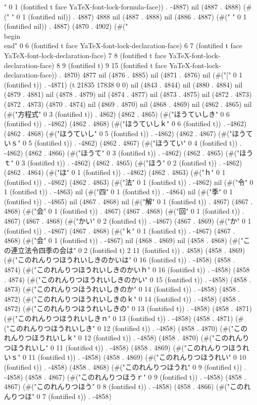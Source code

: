 " 0 1 (fontified t face YaTeX-font-lock-formula-face)) . -4887) nil (4887 . 4888) (#(" " 0 1 (fontified nil)) . 4887) 4888 nil (4887 . 4888) nil (4886 . 4887) (#(" " 0 1 (fontified nil)) . 4887) (4870 . 4902) (#("\\begin{}
\\end{}" 0 6 (fontified t face YaTeX-font-lock-declaration-face) 6 7 (fontified t face YaTeX-font-lock-declaration-face) 7 8 (fontified t face YaTeX-font-lock-declaration-face) 8 9 (fontified t) 9 15 (fontified t face YaTeX-font-lock-declaration-face)) . 4870) 4877 nil (4876 . 4885) nil (4871 . 4876) nil (#("[" 0 1 (fontified t)) . -4871) (t 21835 17838 0 0) nil (4843 . 4844) nil (4880 . 4884) nil (4879 . 4881) nil (4878 . 4879) nil (4874 . 4877) nil (4873 . 4875) nil (4872 . 4873) (4872 . 4873) (4870 . 4874) nil (4869 . 4870) nil (4868 . 4869) nil (4862 . 4865) nil (#("方程式" 0 3 (fontified t)) . 4862) (4862 . 4865) (#("ほうていしき" 0 6 (fontified t)) . -4862) (4862 . 4868) (#("ほうていしｋ" 0 6 (fontified t)) . -4862) (4862 . 4868) (#("ほうていし" 0 5 (fontified t)) . -4862) (4862 . 4867) (#("ほうていｓ" 0 5 (fontified t)) . -4862) (4862 . 4867) (#("ほうてい" 0 4 (fontified t)) . -4862) (4862 . 4866) (#("ほうて" 0 3 (fontified t)) . -4862) (4862 . 4865) (#("ほうｔ" 0 3 (fontified t)) . -4862) (4862 . 4865) (#("ほう" 0 2 (fontified t)) . -4862) (4862 . 4864) (#("ほ" 0 1 (fontified t)) . -4862) (4862 . 4863) (#("ｈ" 0 1 (fontified t)) . -4862) (4862 . 4863) (#("法" 0 1 (fontified t)) . -4862) nil (#("令" 0 1 (fontified t)) . -4863) nil (#("四" 0 1 (fontified t)) . -4864) nil (#("季" 0 1 (fontified t)) . -4865) nil (4867 . 4868) nil (#("解" 0 1 (fontified t)) . 4867) (4867 . 4868) (#("会" 0 1 (fontified t)) . 4867) (4867 . 4868) (#("回" 0 1 (fontified t)) . 4867) (4867 . 4868) (#("かい" 0 2 (fontified t)) . -4867) (4867 . 4869) (#("か" 0 1 (fontified t)) . -4867) (4867 . 4868) (#("ｋ" 0 1 (fontified t)) . -4867) (4867 . 4868) (#("会" 0 1 (fontified t)) . -4867) nil (4868 . 4869) nil (4858 . 4868) (#("この連立法令四季の会は" 0 2 (fontified t) 2 11 (fontified t)) . 4858) (4858 . 4869) (#("このれんりつほうれいしきのかいは" 0 16 (fontified t)) . -4858) (4858 . 4874) (#("このれんりつほうれいしきのかいｈ" 0 16 (fontified t)) . -4858) (4858 . 4874) (#("このれんりつほうれいしきのかい" 0 15 (fontified t)) . -4858) (4858 . 4873) (#("このれんりつほうれいしきのか" 0 14 (fontified t)) . -4858) (4858 . 4872) (#("このれんりつほうれいしきのｋ" 0 14 (fontified t)) . -4858) (4858 . 4872) (#("このれんりつほうれいしきの" 0 13 (fontified t)) . -4858) (4858 . 4871) (#("このれんりつほうれいしきｎ" 0 13 (fontified t)) . -4858) (4858 . 4871) (#("このれんりつほうれいしき" 0 12 (fontified t)) . -4858) (4858 . 4870) (#("このれんりつほうれいしｋ" 0 12 (fontified t)) . -4858) (4858 . 4870) (#("このれんりつほうれいし" 0 11 (fontified t)) . -4858) (4858 . 4869) (#("このれんりつほうれいｓ" 0 11 (fontified t)) . -4858) (4858 . 4869) (#("このれんりつほうれい" 0 10 (fontified t)) . -4858) (4858 . 4868) (#("このれんりつほうれ" 0 9 (fontified t)) . -4858) (4858 . 4867) (#("このれんりつほうｒ" 0 9 (fontified t)) . -4858) (4858 . 4867) (#("このれんりつほう" 0 8 (fontified t)) . -4858) (4858 . 4866) (#("このれんりつほ" 0 7 (fontified t)) . -4858) 